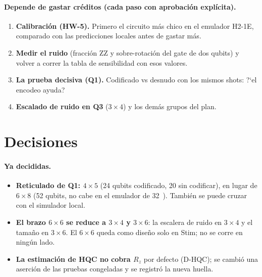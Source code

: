 \documentclass[11pt,a4paper]{article}
\begin{document}
\paragraph{Depende de gastar cr\'editos (cada paso con aprobaci\'on expl\'icita).}
\begin{enumerate}[leftmargin=1.6em]
  \item \textbf{Calibraci\'on (HW-5).} Primero el circuito m\'as chico en el emulador H2-1E, comparado con las
    predicciones locales antes de gastar m\'as.
  \item \textbf{Medir el ruido} (fracci\'on ZZ y sobre-rotaci\'on del gate de dos qubits) y volver a correr la
    tabla de sensibilidad con esos valores.
  \item \textbf{La prueba decisiva (Q1).} Codificado vs desnudo con los mismos shots: ?`el encodeo ayuda?
  \item \textbf{Escalado de ruido en Q3} ($3{\times}4$) y los dem\'as grupos del plan.
\end{enumerate}


\section{Decisiones}\label{sec:decisiones}

\paragraph{Ya decididas.}
\begin{itemize}[leftmargin=1.4em]
  \item \textbf{Reticulado de Q1: $4{\times}5$} (24 qubits codificado, 20 sin codificar), en lugar de $6{\times}8$
    (52 qubits, no cabe en el emulador de 32~\cite{quantinuumemul}). Tambi\'en se puede cruzar con el simulador local.
  \item \textbf{El brazo $6{\times}6$ se reduce a $3{\times}4$ y $3{\times}6$}: la escalera de ruido en $3{\times}4$ y
    el tama\~no en $3{\times}6$. El $6{\times}6$ queda como dise\~no solo en Stim; no se corre en ning\'un lado.
  \item \textbf{La estimaci\'on de HQC no cobra $R_z$} por defecto (D-HQC); se cambi\'o una aserci\'on de las pruebas
    congeladas y se registr\'o la nueva huella.
\end{itemize}
\end{document}
